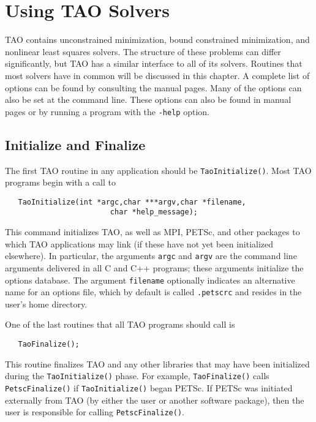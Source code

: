 %
%

\chapter{Using TAO Solvers}
\label{chapter:tao_solver}

TAO contains unconstrained minimization, bound constrained minimization, 
and nonlinear least squares solvers.
The structure of these problems can differ significantly, 
but TAO has a similar interface to all of its solvers.  
Routines that most solvers have in common will be discussed in 
this chapter.
A complete list of options can be found by consulting the manual pages.
Many of the options can also be set at the command line.  These options
can also be found in manual pages or by
running a program with the {\tt -help} option.


\section{Initialize and Finalize}
The first TAO routine in any application should be {\tt TaoInitialize()}.
Most TAO programs begin with a call to
\begin{verbatim}
   TaoInitialize(int *argc,char ***argv,char *filename, 
                        char *help_message);
\end{verbatim}
\noindent
This command initializes TAO, as well as MPI, PETSc, and other packages
to which TAO applications may link (if these have not yet
been initialized elsewhere).  
In particular, the arguments {\tt argc} and 
{\tt argv} are the command line arguments delivered in all C and C++
programs; these arguments initialize the options database.  
 The argument {\tt filename}
optionally indicates an alternative name for an options file, which by
default is called {\tt .petscrc} and resides in the user's home directory.

One of the last routines that all TAO programs should 
call is 
\begin{verbatim}
   TaoFinalize();
\end{verbatim}
\noindent
This routine finalizes TAO and any other libraries that may have been
initialized during the {\tt TaoInitialize()} phase.
For example, {\tt TaoFinalize()}
calls {\tt PetscFinalize()} 
if {\tt TaoInitialize()}
began PETSc. If PETSc was initiated externally from TAO (by either
the user or another software package), then the user is
responsible for calling {\tt PetscFinalize()}. 

